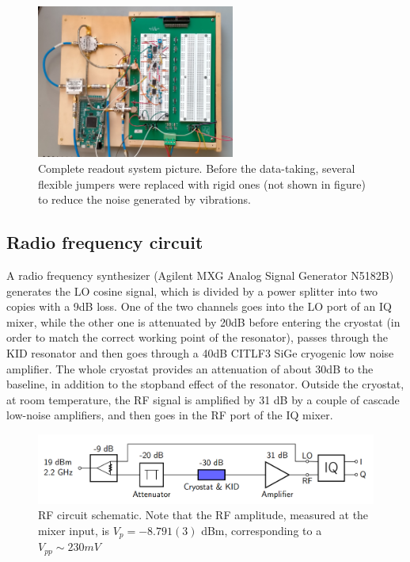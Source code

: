 \documentclass[12pt]{article}
\begin{document}
\begin{figure}[H]
\centering
\includegraphics[width=0.58\textwidth]{circuitocompleto.jpg}
\caption{Complete readout system picture. Before the data-taking, several flexible jumpers were replaced with rigid ones (not shown in figure) to reduce the noise generated by vibrations.}
\end{figure}
\subsection{Radio frequency circuit}
A radio frequency synthesizer (Agilent MXG Analog Signal Generator N5182B) generates the LO cosine signal, which is divided by a power splitter into two copies with a 9dB loss. One of the two channels goes into the LO port of an IQ mixer, while the other one is attenuated by 20dB before entering the cryostat (in order to match the correct working point of the resonator), passes through the KID resonator and then goes through a 40dB CITLF3 SiGe cryogenic low noise amplifier.
The whole cryostat provides an attenuation of about 30dB to the baseline, in addition to the stopband effect of the resonator.
Outside the cryostat, at room temperature, the RF signal is amplified by 31 dB by a couple of cascade low-noise amplifiers, and then goes in the RF port of the IQ mixer.
\begin{figure}[H]
        \centering
        \includegraphics[width=\textwidth]{RFcircuito.PNG}
        \footnotesize{\caption{RF circuit schematic. Note that the RF amplitude, measured at the mixer input, is $V_p = -8.791(3)$ dBm, corresponding to a $V_{pp} \sim 230 mV$}}
        \label{RFcircuit}
    \end{figure}
\end{document}

